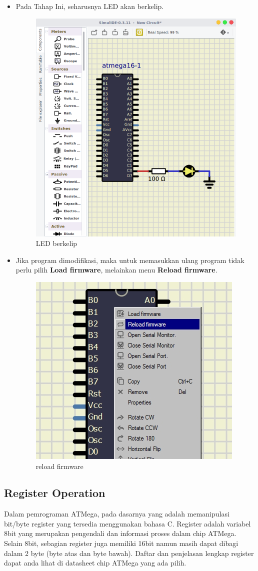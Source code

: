 \documentclass[12pt,]{article}
\begin{document}
\begin{itemize}
		\item Pada Tahap Ini, seharusnya LED akan berkelip.

		\begin{figure}[H]
			\centering
			\includegraphics[width=0.5\linewidth]{images/tessim_4}
			\caption{LED berkelip}
		\end{figure}

		\item Jika program dimodifikasi, maka untuk memasukkan ulang program tidak perlu pilih \textbf{Load firmware},
		melainkan menu \textbf{Reload firmware}.

		\begin{figure}[H]
			\centering
			\includegraphics[width=0.5\linewidth]{images/tessim_5}
			\caption{reload firmware}
		\end{figure}
	\end{itemize}

	\newpage
	\subsection{Register Operation}

	Dalam pemrograman ATMega, pada dasarnya yang adalah memanipulasi bit/byte register yang tersedia menggunakan bahasa C.
	Register adalah variabel 8bit yang merupakan pengendali dan informasi proses dalam chip ATMega.
	Selain 8bit, sebagian register juga memiliki 16bit namun masih dapat dibagi dalam 2 byte (byte atas dan byte bawah).
	Daftar dan penjelasan lengkap register dapat anda lihat di datasheet chip ATMega yang ada pilih.
\end{document}
